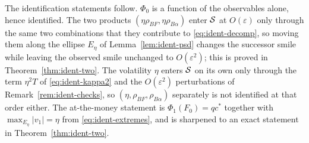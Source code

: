 \documentclass[../../../main.tex]{subfiles}
\begin{document}
\begin{route}
The identification statements follow. $\Phi_0$ is a function of the observables alone, hence identified. The two products $(\eta\rho_{BF},\eta\rho_{B\alpha})$ enter $\mathcal S$ at $O(\varepsilon)$ only through the same two combinations that they contribute to \eqref{eq:ident-decomp}, so moving them along the ellipse $E_\eta$ of Lemma~\ref{lem:ident-psd} changes the successor smile while leaving the observed smile unchanged to $O(\varepsilon^2)$; this is proved in Theorem~\ref{thm:ident-two}. The volatility $\eta$ enters $\mathcal S$ on its own only through the term $\eta^2T$ of \eqref{eq:ident-kappa2} and the $O(\varepsilon^2)$ perturbations of Remark~\ref{rem:ident-checks}, so $(\eta,\rho_{BF},\rho_{B\alpha})$ separately is not identified at that order either. The at-the-money statement is $\Phi_1(F_0)=qc^*$ together with $\max_{E_\eta}|v_1|=\eta$ from \eqref{eq:ident-extremes}, and is sharpened to an exact statement in Theorem~\ref{thm:ident-two}.
\end{route}
\end{document}
